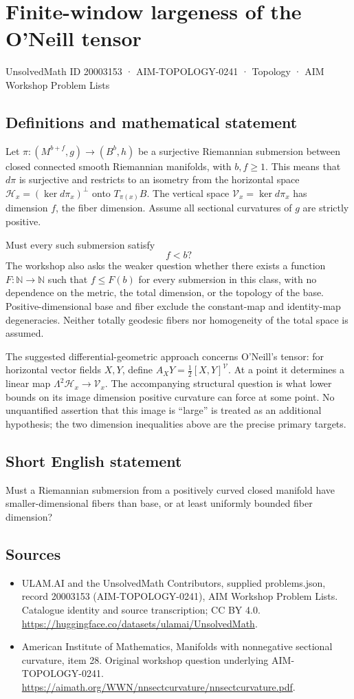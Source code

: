 \documentclass[11pt,a4paper]{article}
\begin{document}
\section*{Finite-window largeness of the O'Neill tensor}\label{20003153}
{\small UnsolvedMath ID 20003153 · AIM-TOPOLOGY-0241 · Topology · AIM Workshop Problem Lists}
\subsection{Definitions and mathematical statement}
Let $\pi:(M^{b+f},g)\to(B^b,h)$ be a surjective Riemannian submersion between closed connected smooth Riemannian manifolds, with $b,f\geq1$.
This means that $d\pi$ is surjective and restricts to an isometry from the horizontal space
$\mathcal H_x=(\ker d\pi_x)^\perp$ onto $T_{\pi(x)}B$.
The vertical space $\mathcal V_x=\ker d\pi_x$ has dimension $f$, the fiber dimension.
Assume all sectional curvatures of $g$ are strictly positive.

Must every such submersion satisfy
\[
 f<b?
\]
The workshop also asks the weaker question whether there exists a function $F:\mathbb N\to\mathbb N$ such that $f\leq F(b)$ for every submersion in this class, with no dependence on the metric, the total dimension, or the topology of the base.
Positive-dimensional base and fiber exclude the constant-map and identity-map degeneracies.
Neither totally geodesic fibers nor homogeneity of the total space is assumed.

The suggested differential-geometric approach concerns O'Neill's tensor:
for horizontal vector fields $X,Y$, define $A_XY=\tfrac12[X,Y]^{\mathcal V}$.
At a point it determines a linear map
$\Lambda^2\mathcal H_x\to\mathcal V_x$.
The accompanying structural question is what lower bounds on its image dimension positive curvature can force at some point.
No unquantified assertion that this image is ``large'' is treated as an additional hypothesis; the two dimension inequalities above are the precise primary targets.
\subsection{Short English statement}
Must a Riemannian submersion from a positively curved closed manifold have smaller-dimensional fibers than base, or at least uniformly bounded fiber dimension?
\subsection{Sources}
\begin{itemize}
\item[S1] ULAM.AI and the UnsolvedMath Contributors, supplied problems.json, record 20003153 (AIM-TOPOLOGY-0241), AIM Workshop Problem Lists. Catalogue identity and source transcription; CC BY 4.0.
\url{https://huggingface.co/datasets/ulamai/UnsolvedMath}.
\item[S2] American Institute of Mathematics, Manifolds with nonnegative sectional curvature, item 28. Original workshop question underlying AIM-TOPOLOGY-0241.
\url{https://aimath.org/WWN/nnsectcurvature/nnsectcurvature.pdf}.
\end{itemize}
\end{document}
